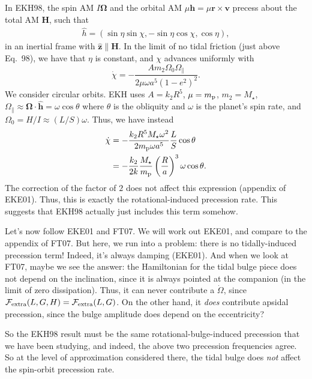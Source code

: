 \documentclass[12pt]{article}
\newcommand*{\bm}[1]{\boldsymbol{\mathbf{#1}}}
\newcommand*{\uv}[1]{\hat{\bm{#1}}}
\newcommand*{\p}[1]{\left(#1\right)}
\begin{document}
In EKH98, the spin AM $I\bm{\Omega}$ and the orbital AM $\mu \bm{h} = \mu \bm{r}
\times \bm{v}$ precess about the total AM $\bm{H}$, such that
\begin{align}
    \hat{h} = \p{\sin\eta \sin\chi, -\sin \eta \cos \chi, \cos \eta},
\end{align}
in an inertial frame with $\uv{z} \parallel \bm{H}$. In the limit of no tidal
friction (just above Eq.~98), we have that $\eta$ is constant, and $\chi$
advances uniformly with
\begin{equation}
    \dot{\chi} =
        -\frac{Am_2\Omega_0 \Omega_\parallel}{2\mu\omega a^5 (1 - e^2)^2}.
\end{equation}
We consider circular orbits. EKH uses $A = k_2R^5$, $\mu = m_{\rm p}$, $m_2 =
M_\star$, $\Omega_{\parallel} \approx \bm{\Omega} \cdot \uv{h} = \omega \cos
\theta$ where $\theta$ is the obliquity and $\omega$ is the planet's spin rate,
and $\Omega_0 = H / I \approx (L / S)\omega$. Thus, we have instead
\begin{align}
    \dot{\chi}
        &=
            -\frac{k_2R^5 M_\star \omega^2}{2m_{\rm p}\omega a^5}
                \frac{L}{S}\cos\theta\nonumber\\
        &=
            -\frac{k_2}{2k}
            \frac{M_\star}{m_{\rm p}}
            \p{\frac{R}{a}}^3
            \omega \cos \theta.
\end{align}
The correction of the factor of $2$ does not affect this expression (appendix of
EKE01). Thus, this is exactly the rotational-induced precession rate. This
suggests that EKH98 actually just includes this term somehow.

Let's now follow EKE01 and FT07. We will work out EKE01, and compare to the
appendix of FT07. But here, we run into a problem: there is no tidally-induced
precession term! Indeed, it's always damping (EKE01). And when we look at FT07,
maybe we see the answer: the Hamiltonian for the tidal bulge piece does not
depend on the inclination, since it is always pointed at the companion (in the
limit of zero dissipation). Thus, it can never contribute a $\dot{\Omega}$,
since $\mathcal{F}_{\rm extra}(L, G, H) = \mathcal{F}_{\rm extra}(L, G)$. On the
other hand, it \emph{does} contribute apsidal precession, since the bulge
amplitude does depend on the eccentricity?

So the EKH98 result must be the same rotational-bulge-induced precession that we
have been studying, and indeed, the above two precession frequencies agree. So
at the level of approximation considered there, the tidal bulge does \emph{not}
affect the spin-orbit precession rate.
\end{document}
